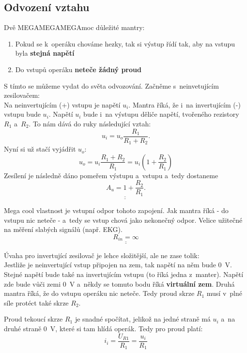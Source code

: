\documentclass[a4paper,12pt]{article}   %
\begin{document}
\subsection*{Odvození vztahu}
Dvě MEGAMEGAMEGAmoc důležité mantry:
\begin{enumerate}
    \item Pokud se k~operáku chováme hezky, tak si výstup řídí tak, aby na vstupu byla \textbf{stejná napětí}
    \item Do vstupů operáku \textbf{neteče žádný proud}
\end{enumerate}

S tímto se můžeme vydat do světa odvozování. Začněme s~neinvetujícím zesilovačem:\\
Na neinvertujícím (+) vstupu je napětí $u_i$. Mantra říká, že i~na invertujícím (-) vstupu bude $u_i$. Napětí $u_i$ bude i~na výstupu děliče napětí, tvořeného rezistory $R_1$ a~$R_2$. To nám dává do ruky následující vztah:
\begin{equation*}
    u_i = u_o \frac{R_1}{R_1 + R_2}.
\end{equation*}
Nyní si už stačí vyjádřit $u_o$:
\begin{equation*}
    u_o = u_i \frac{R_1 + R_2}{R_1} = u_i (1+\frac{R_2}{R_1})
\end{equation*}
Zesílení je následně dáno pomeřem výstupu a~vstupu a~tedy dostaneme
\begin{equation*}
    \underline{\underline{A_u = 1+\frac{R_2}{R_1}}}.
\end{equation*}

Mega cool vlastnost je vstupní odpor tohoto zapojení. Jak mantra říká - do vstupu nic neteče - a~tedy se vstup chová jako nekonečný odpor. Velice užitečné na měření slabých signálů (např. EKG).
\begin{equation*}
    \underline{\underline{R_{in} = \infty}}
\end{equation*}

Úvaha pro invertující zesilovač je lehce složitější, ale ne zase tolik:\\
Jestliže je neinvertující vstup připojen na zem, tak napětí na něm bude $0$~V. Stejné napětí bude také na invertujícím vstupu (to říká jedna z~manter). Napětí zde bude vůči zemi 0~V a~někdy se tomuto bodu říká \textbf{virtuální zem}. Druhá mantra říká, že do vstupu operáku nic neteče. Tedy proud skrze $R_1$ musí v~plné síle protéct také skrze $R_2$.

Proud tekoucí skrze $R_1$ je snadné spočítat, jelikož na jedné straně má $u_i$ a~na druhé straně 0~V, které si tam hlídá operák. Tedy pro proud platí:
\begin{equation*}
    i_i = \frac{U_{R1}}{R_1} = \frac{u_i}{R_1}
\end{equation*}
\end{document}
